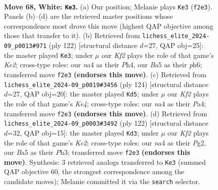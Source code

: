 \documentclass[11pt]{article}
\begin{document}
\clearpage

\begin{figure}[p]\centering
\begin{subfigure}{0.46\textwidth}\centering
\resizebox{\linewidth}{!}{%
\newchessgame
\chessboard[
  setfen={1r6/4b1k1/B2p3p/B3p3/n3P2p/5P2/5K2/7R w - - 5 68},
  showmover=false,
  pgfstyle=straightmove, color=movearrow, markmove={f2-e3}
]}
\caption{}
\end{subfigure}\hfill
\begin{subfigure}{0.46\textwidth}\centering
\resizebox{\linewidth}{!}{%
\newchessgame
\chessboard[
  setfen={5k2/6pB/4p2p/3b4/4p1PP/8/4KP2/8 w - - 0 62},
  showmover=false,
  pgfstyle=straightmove, color=movearrow, markmove={e2-e3}
]}
\caption{}
\end{subfigure}
\\[4pt]
\begin{subfigure}{0.46\textwidth}\centering
\resizebox{\linewidth}{!}{%
\newchessgame
\chessboard[
  setfen={8/R4pk1/7p/pB6/Pb2KPP1/8/8/2r5 w - - 19 63},
  showmover=false,
  pgfstyle=straightmove, color=movearrow, markmove={e4-d5}
]}
\caption{}
\end{subfigure}\hfill
\begin{subfigure}{0.46\textwidth}\centering
\resizebox{\linewidth}{!}{%
\newchessgame
\chessboard[
  setfen={4B3/6k1/1p4p1/p6p/P2b4/7P/2K3P1/8 w - - 2 62},
  showmover=false,
  pgfstyle=straightmove, color=movearrow, markmove={c2-d3}
]}
\caption{}
\end{subfigure}
\caption{\textbf{Move 68, White: \texttt{Ke3}.} (a) Our position; Melanie plays \texttt{Ke3} (\texttt{f2e3}). Panels (b)--(d) are the retrieved master positions whose correspondence most drove this move (highest QAP objective among those that transfer to it). (b) Retrieved from \texttt{lichess\_elite\_2024-09\_p0013\#971} (ply 122) [structural distance $d$=27, QAP obj=25]: the master played \texttt{Ke3}; under $\mu$ our \emph{Kf2} plays the role of that game's \emph{Ke2}; cross-type roles: our \emph{n}a4 as their \emph{P}h4, our \emph{B}a5 as their \emph{p}h6; transferred move \texttt{f2e3} \textbf{(endorses this move)}. (c) Retrieved from \texttt{lichess\_elite\_2024-09\_p0019\#3456} (ply 124) [structural distance $d$=27, QAP obj=20]: the master played \texttt{Kd5}; under $\mu$ our \emph{Kf2} plays the role of that game's \emph{Ke4}; cross-type roles: our \emph{n}a4 as their \emph{P}a4; transferred move \texttt{f2e3} \textbf{(endorses this move)}. (d) Retrieved from \texttt{lichess\_elite\_2024-09\_p0003\#3492} (ply 122) [structural distance $d$=32, QAP obj=15]: the master played \texttt{Kd3}; under $\mu$ our \emph{Kf2} plays the role of that game's \emph{Kc2}; cross-type roles: our \emph{n}a4 as their \emph{P}g2, our \emph{B}a5 as their \emph{P}h3; transferred move \texttt{f2e3} \textbf{(endorses this move)}. Synthesis: 3 retrieved analogs transferred to \texttt{Ke3} (summed QAP objective 60, the strongest correspondence among the candidate moves); Melanie committed it via the \texttt{search} selector.}
\label{fig:thought-m134}
\end{figure}
\end{document}
